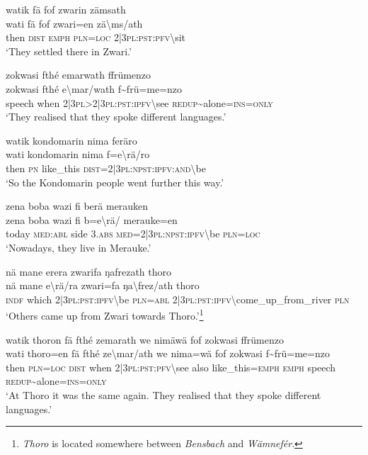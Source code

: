 \ea\label{ex:1:a3613}
watik fä fof zwarin zämsath\\
\gll wati	fä	fof	zwari=en	zä{\textbackslash}ms/ath\\
     then	\textsc{dist}	\textsc{emph}	\textsc{pln}=\textsc{loc}	2|3\textsc{pl}:\textsc{pst}:\textsc{pfv}{\textbackslash}sit\\
\glt `They settled there in Zwari.'
\z

\ea\label{ex:1:a3616}
zokwasi fthé emarwath ffrümenzo\\
\gll zokwasi	fthé	e{\textbackslash}mar/wath	f{\textasciitilde}frü=me=nzo\\
     speech	when	2|3\textsc{pl}>2|3\textsc{pl}:\textsc{pst}:\textsc{ipfv}{\textbackslash}see	\textsc{redup}{\textasciitilde}alone=\textsc{ins}=\textsc{only}\\
\glt `They realised that they spoke different languages.'
\z

\ea\label{ex:1:a3617}
watik kondomarin nima feräro\\
\gll wati	kondomarin	nima	f=e{\textbackslash}rä/ro\\
     then	\textsc{pn}	like\_this	\textsc{dist}=2|3\textsc{pl}:\textsc{npst}:\textsc{ipfv}:\textsc{and}{\textbackslash}be\\
\glt `So the Kondomarin people went further this way.'
\z

\ea\label{ex:1:a3619}
zena boba wazi fi berä merauken\\
\gll zena	boba	wazi	fi	b=e{\textbackslash}rä/	merauke=en\\
     today	\textsc{med}:\textsc{abl}	side	3.\textsc{abs}	\textsc{med}=2|3\textsc{pl}:\textsc{npst}:\textsc{ipfv}{\textbackslash}be	\textsc{pln}=\textsc{loc}\\
\glt `Nowadays, they live in Merauke.'
\z

\ea\label{ex:1:a3620}
nä mane erera zwarifa ŋafrezath thoro\\
\gll nä	mane	e{\textbackslash}rä/ra	zwari=fa	ŋa{\textbackslash}frez/ath	thoro\\
     \textsc{indf}	which	2|3\textsc{pl}:\textsc{pst}:\textsc{ipfv}{\textbackslash}be	\textsc{pln}=\textsc{abl}	2|3\textsc{pl}:\textsc{pst}:\textsc{ipfv}{\textbackslash}come\_up\_from\_river	\textsc{pln}\\
\glt `Others came up from Zwari towards Thoro.'\footnote{\textit{Thoro} is located somewhere between \textit{Bensbach} and \textit{Wämnefér}.}
\z

\ea\label{ex:1:a3622}
watik thoron fä fthé zemarath we nimäwä fof zokwasi ffrümenzo\\
\gll wati	thoro=en	fä	fthé	ze{\textbackslash}mar/ath	we	nima=wä	fof	zokwasi	f{\textasciitilde}frü=me=nzo\\
     then	\textsc{pln}=\textsc{loc}	\textsc{dist}	when	2|3\textsc{pl}:\textsc{pst}:\textsc{pfv}{\textbackslash}see	also	like\_this=\textsc{emph}	\textsc{emph}	speech	\textsc{redup}{\textasciitilde}alone=\textsc{ins}=\textsc{only}\\
\glt `At Thoro it was the same again. They realised that they spoke different languages.'
\z


